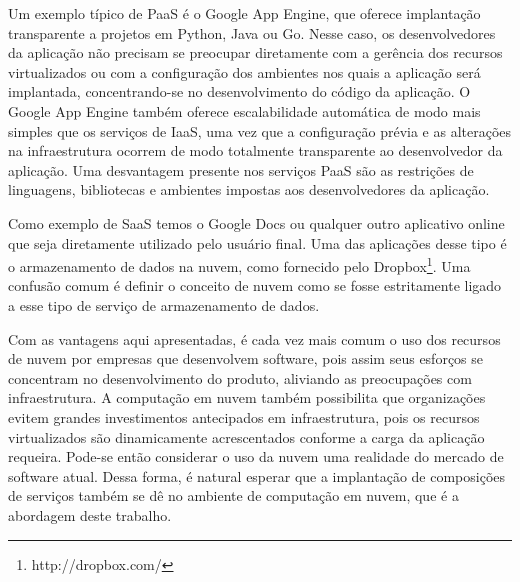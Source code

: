 Um exemplo típico de PaaS é o Google App Engine, que oferece implantação transparente a projetos em Python, Java ou Go. Nesse caso, os desenvolvedores da aplicação não precisam se preocupar diretamente com a gerência dos recursos virtualizados ou com a configuração dos ambientes nos quais a aplicação será implantada, concentrando-se no desenvolvimento do código da aplicação. O Google App Engine também oferece escalabilidade automática de modo mais simples que os serviços de IaaS, uma vez que a configuração prévia e as alterações na infraestrutura ocorrem de modo totalmente transparente ao desenvolvedor da aplicação. Uma desvantagem presente nos serviços PaaS são as restrições de linguagens, bibliotecas e ambientes impostas aos desenvolvedores da aplicação.

Como exemplo de SaaS temos o Google Docs ou qualquer outro aplicativo online que seja diretamente utilizado pelo usuário final. Uma das aplicações desse tipo é o armazenamento de dados na nuvem, como fornecido pelo Dropbox\footnote{http://dropbox.com/}. Uma confusão comum é definir o conceito de nuvem como se fosse estritamente ligado a esse tipo de serviço de armazenamento de dados.

Com as vantagens aqui apresentadas, é cada vez mais comum o uso dos recursos de nuvem por empresas que desenvolvem software, pois assim seus esforços se concentram no desenvolvimento do produto, aliviando as preocupações com infraestrutura. A computação em nuvem também possibilita que organizações evitem grandes investimentos antecipados em infraestrutura, pois os recursos virtualizados são dinamicamente acrescentados conforme a carga da aplicação requeira. Pode-se então considerar o uso da nuvem uma realidade do mercado de software atual. Dessa forma, é natural esperar que a implantação de composições de serviços também se dê no ambiente de computação em nuvem, que é a abordagem deste trabalho. 
